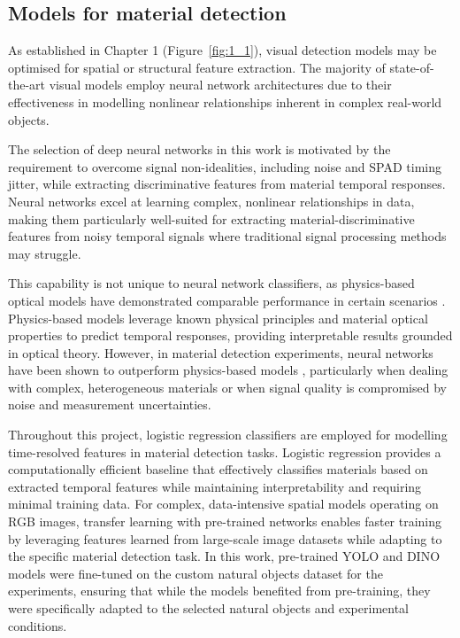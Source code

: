 \documentclass[12pt,a4paper,oneside]{report}
\begin{document}
\subsection{Models for material detection}
\label{subsec:models_material_detection}

As established in Chapter 1 (Figure~\ref{fig:1_1}), visual detection models may be optimised for spatial or structural feature extraction. The majority of state-of-the-art visual models employ neural network architectures due to their effectiveness in modelling nonlinear relationships inherent in complex real-world objects.

The selection of deep neural networks in this work is motivated by the requirement to overcome signal non-idealities, including noise and SPAD timing jitter, while extracting discriminative features from material temporal responses. Neural networks excel at learning complex, nonlinear relationships in data, making them particularly well-suited for extracting material-discriminative features from noisy temporal signals where traditional signal processing methods may struggle.

This capability is not unique to neural network classifiers, as physics-based optical models have demonstrated comparable performance in certain scenarios \cite{becker2023}. Physics-based models leverage known physical principles and material optical properties to predict temporal responses, providing interpretable results grounded in optical theory. However, in material detection experiments, neural networks have been shown to outperform physics-based models \cite{becker2023}, particularly when dealing with complex, heterogeneous materials or when signal quality is compromised by noise and measurement uncertainties.

Throughout this project, logistic regression classifiers are employed for modelling time-resolved features in material detection tasks. Logistic regression provides a computationally efficient baseline that effectively classifies materials based on extracted temporal features while maintaining interpretability and requiring minimal training data. For complex, data-intensive spatial models operating on RGB images, transfer learning with pre-trained networks \cite{bozinovski2020} enables faster training by leveraging features learned from large-scale image datasets while adapting to the specific material detection task. In this work, pre-trained YOLO and DINO models were fine-tuned on the custom natural objects dataset for the experiments, ensuring that while the models benefited from pre-training, they were specifically adapted to the selected natural objects and experimental conditions.
\end{document}
